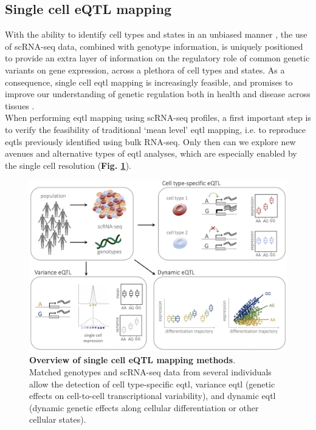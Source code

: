 \newpage

\subsection{Single cell eQTL mapping}
\label{sec:sc_eqtl}

With the ability to identify cell types and states in an unbiased manner \cite{kolodziejczyk2015technology, trapnell2015defining}, the use of scRNA-seq data, combined with genotype information, is uniquely positioned to provide an extra layer of information on the regulatory role of common genetic variants on gene expression, across a plethora of cell types and states.
As a consequence, single cell \gls{eqtl} mapping is increasingly feasible, and promises to improve our understanding of genetic regulation both in health and disease across tissues \cite{wills2013single, van2018single, sarkar2019discovery, jerber2020population, van2020single1, cuomo2020single}. \\

When performing \gls{eqtl} mapping using scRNA-seq profiles, a first important step is to verify the feasibility of traditional `mean level' \gls{eqtl} mapping, i.e. to reproduce \glspl{eqtl} previously identified using bulk RNA-seq.
Only then can we explore new avenues and alternative types of \gls{eqtl} analyses, which are especially enabled by the single cell resolution (\textbf{Fig. \ref{fig:sc_eqtl}}).\\

\begin{figure}[h]
\centering
\includegraphics[width=14cm]{Chapter3/Fig/sc_eqtl.png}
\caption[Single cell eQTL]{\textbf{Overview of single cell eQTL mapping methods}.\\
Matched genotypes and scRNA-seq data from several individuals allow the detection of cell type-specific \gls{eqtl}, variance \gls{eqtl} (genetic effects on cell-to-cell transcriptional variability), and dynamic \gls{eqtl} (dynamic genetic effects along cellular differentiation or other cellular states).}
\label{fig:sc_eqtl}
\end{figure}

